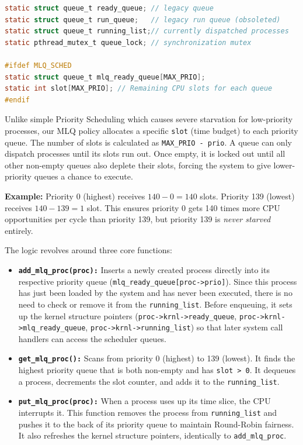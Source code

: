 \begin{lstlisting}[language=C, caption=Scheduler Definitions]
static struct queue_t ready_queue; // legacy queue
static struct queue_t run_queue;   // legacy run queue (obsoleted)
static struct queue_t running_list;// currently dispatched processes
static pthread_mutex_t queue_lock; // synchronization mutex

#ifdef MLQ_SCHED
static struct queue_t mlq_ready_queue[MAX_PRIO]; 
static int slot[MAX_PRIO]; // Remaining CPU slots for each queue
#endif
\end{lstlisting}

\begin{theorybox}
Unlike simple Priority Scheduling which causes severe starvation for low-priority processes, our MLQ policy allocates a specific \texttt{slot} (time budget) to each priority queue. The number of slots is calculated as \texttt{MAX\_PRIO - prio}. A queue can only dispatch processes until its slots run out. Once empty, it is locked out until all other non-empty queues also deplete their slots, forcing the system to give lower-priority queues a chance to execute.

\textbf{Example:} Priority 0 (highest) receives $140 - 0 = 140$ slots. Priority 139 (lowest) receives $140 - 139 = 1$ slot. This ensures priority 0 gets 140 times more CPU opportunities per cycle than priority 139, but priority 139 is \textit{never starved} entirely.
\end{theorybox}

The logic revolves around three core functions:
\begin{itemize}
    \item \textbf{\texttt{add\_mlq\_proc(proc):}} Inserts a newly created process directly into its respective priority queue (\texttt{mlq\_ready\_queue[proc->prio]}). Since this process has just been loaded by the system and has never been executed, there is no need to check or remove it from the \texttt{running\_list}. Before enqueuing, it sets up the kernel structure pointers (\texttt{proc->krnl->ready\_queue}, \texttt{proc->krnl->mlq\_ready\_queue}, \texttt{proc->krnl->running\_list}) so that later system call handlers can access the scheduler queues.
    \item \textbf{\texttt{get\_mlq\_proc():}} Scans from priority 0 (highest) to 139 (lowest). It finds the highest priority queue that is both non-empty and has \texttt{slot > 0}. It dequeues a process, decrements the slot counter, and adds it to the \texttt{running\_list}.
    \item \textbf{\texttt{put\_mlq\_proc(proc):}} When a process uses up its time slice, the CPU interrupts it. This function removes the process from \texttt{running\_list} and pushes it to the back of its priority queue to maintain Round-Robin fairness. It also refreshes the kernel structure pointers, identically to \texttt{add\_mlq\_proc}.
\end{itemize}

